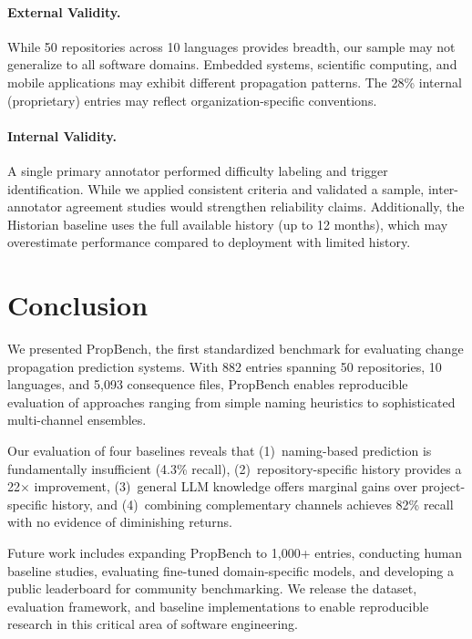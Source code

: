 \documentclass[sigconf,nonacm]{acmart}
\begin{document}
\paragraph{External Validity.} While 50 repositories across 10 languages provides breadth, our sample may not generalize to all software domains. Embedded systems, scientific computing, and mobile applications may exhibit different propagation patterns. The 28\% internal (proprietary) entries may reflect organization-specific conventions.

\paragraph{Internal Validity.} A single primary annotator performed difficulty labeling and trigger identification. While we applied consistent criteria and validated a sample, inter-annotator agreement studies would strengthen reliability claims. Additionally, the Historian baseline uses the full available history (up to 12 months), which may overestimate performance compared to deployment with limited history.

\section{Conclusion}
\label{sec:conclusion}

We presented PropBench, the first standardized benchmark for evaluating change propagation prediction systems. With 882 entries spanning 50 repositories, 10 languages, and 5{,}093 consequence files, PropBench enables reproducible evaluation of approaches ranging from simple naming heuristics to sophisticated multi-channel ensembles.

Our evaluation of four baselines reveals that (1)~naming-based prediction is fundamentally insufficient (4.3\% recall), (2)~repository-specific history provides a 22$\times$ improvement, (3)~general LLM knowledge offers marginal gains over project-specific history, and (4)~combining complementary channels achieves 82\% recall with no evidence of diminishing returns.

Future work includes expanding PropBench to 1{,}000+ entries, conducting human baseline studies, evaluating fine-tuned domain-specific models, and developing a public leaderboard for community benchmarking. We release the dataset, evaluation framework, and baseline implementations to enable reproducible research in this critical area of software engineering.
\end{document}
